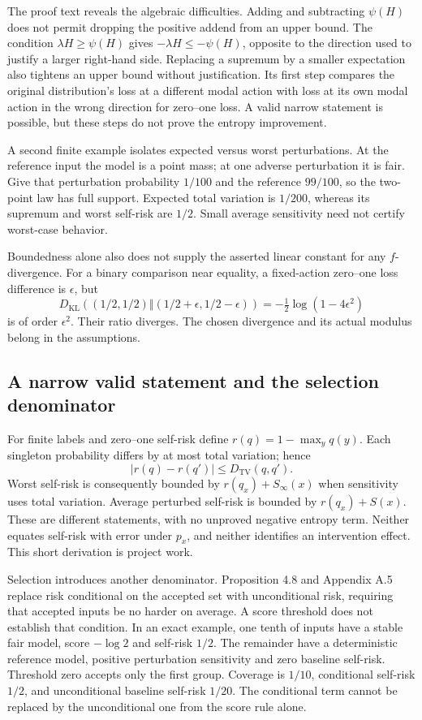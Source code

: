 The proof text reveals the algebraic difficulties. Adding and subtracting
$\psi(H)$ does not permit dropping the positive addend from an upper bound.
The condition $\lambda H\geq\psi(H)$ gives
$-\lambda H\leq-\psi(H)$, opposite to the direction used to justify a
larger right-hand side. Replacing a supremum by a smaller expectation also
tightens an upper bound without justification. Its first step compares the
original distribution's loss at a different modal action with loss at its own
modal action in the wrong direction for zero--one loss. A valid narrow
statement is possible, but these steps do not prove the entropy improvement.
\citep{exec23_sua_original}

A second finite example isolates expected versus worst perturbations. At
the reference input the model is a point mass; at one adverse perturbation
it is fair. Give that perturbation probability $1/100$ and the reference
$99/100$, so the two-point law has full support. Expected total variation is
$1/200$, whereas its supremum and worst self-risk are $1/2$. Small average
sensitivity need not certify worst-case behavior.
\citep{exec23_sua_counterexamples}

Boundedness alone also does not supply the asserted linear constant for any
$f$-divergence. For a binary comparison near equality, a fixed-action
zero--one loss difference is $\epsilon$, but
\[
 D_{\mathrm{KL}}((1/2,1/2)\Vert(1/2+\epsilon,1/2-\epsilon))
 =-\tfrac12\log(1-4\epsilon^2)
\]
is of order $\epsilon^2$. Their ratio diverges. The chosen divergence and
its actual modulus belong in the assumptions.
\citep{exec23_sua_counterexamples}

\subsection{A narrow valid statement and the selection denominator}
For finite labels and zero--one self-risk define $r(q)=1-\max_y q(y)$.
Each singleton probability differs by at most total variation; hence
\[
 |r(q)-r(q')|\leq D_{\mathrm{TV}}(q,q').
\]
Worst self-risk is consequently bounded by $r(q_x)+S_\infty(x)$ when
sensitivity uses total variation. Average perturbed self-risk is bounded by
$r(q_x)+S(x)$. These are different statements, with no unproved negative
entropy term. Neither equates self-risk with error under $p_x$, and neither
identifies an intervention effect. This short derivation is project work.
\citep{exec23_sua_counterexamples}

Selection introduces another denominator. Proposition 4.8 and Appendix A.5
replace risk conditional on the accepted set with unconditional risk,
requiring that accepted inputs be no harder on average. A score threshold
does not establish that condition. In an exact example, one tenth of inputs
have a stable fair model, score $-\log2$ and self-risk $1/2$. The remainder
have a deterministic reference model, positive perturbation sensitivity and
zero baseline self-risk. Threshold zero accepts only the first group.
Coverage is $1/10$, conditional self-risk $1/2$, and unconditional baseline
self-risk $1/20$. The conditional term cannot be replaced by the unconditional
one from the score rule alone. \citep{exec23_sua_original,exec23_sua_counterexamples}


